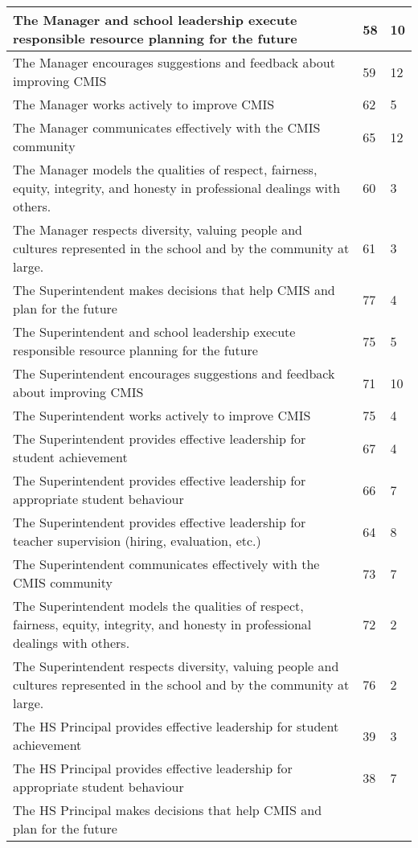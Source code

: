 \begin{table}[h]
\begin{longtabu}{|X[8]|X|X|}
\hline
The Manager and school leadership execute responsible resource planning for the future &
58 &
10 \\
\hline
The Manager encourages suggestions and feedback about improving CMIS &
59 &
12 \\
\hline
The Manager works actively to improve CMIS &
62 &
5 \\
\hline
The Manager communicates effectively with the CMIS community &
65 &
12 \\
\hline
The Manager models the qualities of respect, fairness, equity, integrity, and honesty in professional dealings with others. &
60 &
3 \\
\hline
The Manager respects diversity, valuing people and cultures represented in the school and by the community at large. &
61 &
3 \\
\hline
The Superintendent makes decisions that help CMIS and plan for the future &
77 &
4 \\
\hline
The Superintendent and school leadership execute responsible resource planning for the future &
75 &
5 \\
\hline
The Superintendent encourages suggestions and feedback about improving CMIS &
71 &
10 \\
\hline
The Superintendent works actively to improve CMIS &
75 &
4 \\
\hline
The Superintendent provides effective leadership for student achievement &
67 &
4 \\
\hline
The Superintendent provides effective leadership for appropriate student behaviour &
66 &
7 \\
\hline
The Superintendent provides effective leadership for teacher supervision (hiring, evaluation, etc.) &
64 &
8 \\
\hline
The Superintendent communicates effectively with the CMIS community &
73 &
7 \\
\hline
The Superintendent models the qualities of respect, fairness, equity, integrity, and honesty in professional dealings with others. &
72 &
2 \\
\hline
The Superintendent respects diversity, valuing people and cultures represented in the school and by the community at large. &
76 &
2 \\
\hline
The HS Principal provides effective leadership for student achievement &
39 &
3 \\
\hline
The HS Principal provides effective leadership for appropriate student behaviour &
38 &
7 \\
\hline
The HS Principal makes decisions that help CMIS and plan for the future &

\end{longtabu}
\end{table}
